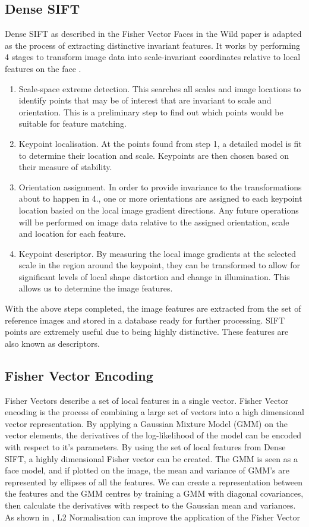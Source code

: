 \documentclass[12pt, a4paper]{article}
\begin{document}
\subsection{Dense SIFT}
Dense SIFT as described in the Fisher Vector Faces in the Wild paper is adapted as the process of extracting distinctive invariant features. It works by performing 4 stages to transform image data into scale-invariant coordinates relative to local features on the face \cite{denseSift}.
\begin{enumerate}
\item Scale-space extreme detection. This searches all scales and image locations to identify points that may be of interest that are invariant to scale and orientation. This is a preliminary step to find out which points would be suitable for feature matching.
\item Keypoint localisation. At the points found from step 1, a detailed model is fit to determine their location and scale. Keypoints are then chosen based on their measure of stability.
\item Orientation assignment. In order to provide invariance to the transformations about to happen in 4., one or more orientations are assigned to each keypoint location basied on the local image gradient directions. Any future operations will be performed on image data relative to the assigned orientation, scale and location for each feature.
\item Keypoint descriptor. By measuring the local image gradients at the selected scale in the region around the keypoint, they can be transformed to allow for significant levels of local shape distortion and change in illumination. This allows us to determine the image features.
\end{enumerate}
With the above steps completed, the image features are extracted from the set of reference images and stored in a database ready for further processing. SIFT points are extremely useful due to being highly distinctive. These features are also known as descriptors.

\subsection{Fisher Vector Encoding}
Fisher Vectors describe a set of local features in a single vector. Fisher Vector encoding is the process of combining a large set of vectors into a high dimensional vector representation. By applying a Gaussian Mixture Model (GMM) on the vector elements, the derivatives of the log-likelihood of the model can be encoded with respect to it’s parameters. By using the set of local features from Dense SIFT, a highly dimensional Fisher vector can be created. The GMM is seen as a face model, and if plotted on the image, the mean and variance of GMM’s are represented by ellipses of all the features. We can create a representation between the features and the GMM centres by training a GMM with diagonal covariances, then calculate the derivatives with respect to the Gaussian mean and variances. As shown in \cite{improvingFisher}, L2 Normalisation can improve the application of the Fisher Vector 
\end{document}

